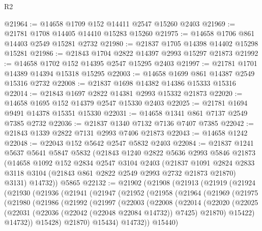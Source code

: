 \begin{lexlean}{R2}
\begin{coremodule}
@21964 := @14658 @1709 @152 @14411 @2547 @15260 @2403
@21969 := @21781 @1708 @14405 @14410 @15283 @15260
@21975 := @14658 @1706 @861 @14403 @2549 @15281 @2732
@21980 := @21837 @1705 @14398 @14402 @15298 @15281
@21986 := @21843 @1704 @2822 @14397 @2993 @15297 @21873
@21992 := @14658 @1702 @152 @14395 @2547 @15295 @2403
@21997 := @21781 @1701 @14389 @14394 @15318 @15295
@22003 := @14658 @1699 @861 @14387 @2549 @15316 @2732
@22008 := @21837 @1698 @14382 @14386 @15333 @15316
@22014 := @21843 @1697 @2822 @14381 @2993 @15332 @21873
@22020 := @14658 @1695 @152 @14379 @2547 @15330 @2403
@22025 := @21781 @1694 @9491 @14378 @15351 @15330
@22031 := @14658 @1341 @861 @7137 @2549 @7385 @2732
@22036 := @21837 @1340 @7132 @7136 @7407 @7385
@22042 := @21843 @1339 @2822 @7131 @2993 @7406 @21873
@22043 := @14658 @1242
@22048 := @22043 @152 @5642 @2547 @5832 @2403
@22084 := @21837
    @1241
    @5637
    @5641
    @5847
    @5832
    (@21843
      @1240
      @2822
      @5636
      @2993
      @5846
      @21873
      (@14658
        @1092
        @152
        @2834
        @2547
        @3104
        @2403
        (@21837
          @1091
          @2824
          @2833
          @3118
          @3104
          (@21843 @861 @2822 @2549 @2993 @2732 @21873 @21870)
          @3131)
        @14732))
    @5865
@22132 := @21902
    (@21908
      (@21913
        (@21919
          (@21924
            (@21930
              (@21936
                (@21941
                  (@21947
                    (@21952
                      (@21958
                        (@21964
                          (@21969
                            (@21975
                              (@21980
                                (@21986
                                  (@21992
                                    (@21997
                                      (@22003
                                        (@22008
                                          (@22014
                                            (@22020
                                              (@22025
                                                (@22031
                                                  (@22036 (@22042 (@22048 @22084 @14732)) @7425)
                                                  @21870)
                                                @15422)
                                              @14732))
                                          @15428)
                                        @21870)
                                      @15434)
                                    @14732))
                                @15440)

\end{coremodule}
\end{lexlean}
